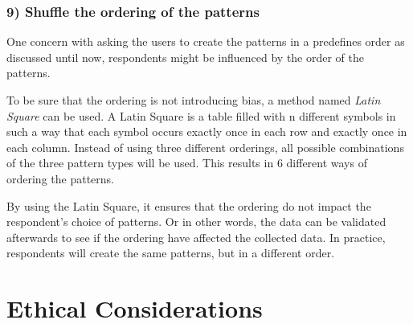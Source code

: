     \subsubsection*{9) Shuffle the ordering of the patterns}
    One concern with asking the users to create the patterns in a predefines order as discussed until now, respondents might be influenced by the order of the patterns. 

    To be sure that the ordering is not introducing bias, a method named {\it Latin Square} can be used. A Latin Square is a table filled with n different symbols in such a way that each symbol occurs exactly once in each row and exactly once in each column. Instead of using three different orderings, all possible combinations of the three pattern types will be used. This results in 6 different ways of ordering the patterns.

    By using the Latin Square, it ensures that the ordering do not impact the respondent's choice of patterns. Or in other words, the data can be validated afterwards to see if the ordering have affected the collected data. In practice, respondents will create the same patterns, but in a different order. 

  \section{Ethical Considerations}\label{sec:ethics}
    
    


